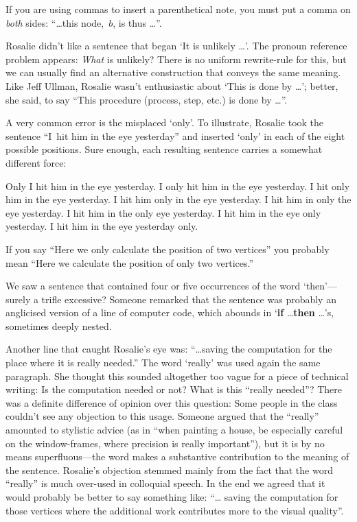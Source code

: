 If you are using commas to insert a parenthetical note, you must put a
comma on {\it both\/} sides: ``\dots this node,~$b$, is thus \dots''.

Rosalie didn't like a sentence that began `It is unlikely \dots'.  The
pronoun reference problem appears: {\it What\/} is unlikely?  There
is no uniform rewrite-rule for this, but we can usually find an
alternative construction that conveys the same meaning. Like Jeff Ullman,
Rosalie wasn't enthusiastic about `This is done by \dots'; better, she
said, to say ``This procedure (process, step, etc.) is done by \dots''.

A very common error is the misplaced `only'. To illustrate, Rosalie
took the sentence ``I~hit him in the eye yesterday'' and inserted
`only' in each of the eight possible positions. Sure enough, each
resulting sentence carries a somewhat different force: 

\smallskip
{\obeylines\parskip 0pt
\qquad\qquad\qquad Only I hit him in the eye yesterday.
\qquad\qquad\qquad I only hit him in the eye yesterday.
\qquad\qquad\qquad I hit only him in the eye yesterday.
\qquad\qquad\qquad I hit him only in the eye yesterday.
\qquad\qquad\qquad I hit him in only the eye yesterday.
\qquad\qquad\qquad I hit him in the only eye yesterday.
\qquad\qquad\qquad I hit him in the eye only yesterday.
\qquad\qquad\qquad I hit him in the eye yesterday only.
}

If
you say ``Here we only calculate the position of two vertices'' you
probably mean ``Here we calculate the position of only two vertices.''

We saw a sentence that contained four or five occurrences of the word
`then'---surely a trifle excessive? Someone remarked that the sentence
was probably an anglicised version of a line of computer code, which
abounds in `{\bf if} \dots {\bf then} \dots's, sometimes deeply nested.

Another line that caught Rosalie's eye was: ``\dots saving the
computation for the place where it is really needed.'' 
The word `really' was used again the same paragraph.
She thought
this sounded altogether too vague for a piece of technical writing: Is
the computation needed or not? What is this ``really needed''? There
was a definite difference of opinion over this question: Some people
in the class couldn't see any objection to this usage. Someone argued
that the ``really'' amounted to stylistic advice (as in ``when
painting a house, be especially careful on the window-frames, where
precision is really important''), but it is  by no means superfluous---the
 word makes a substantive contribution to the meaning of the
sentence. Rosalie's objection stemmed mainly from the fact that the
word ``really'' is much over-used in colloquial speech. In the end we
agreed that it would probably be better to say something like: ``\dots
saving the computation for those vertices where the additional work
contributes more to the visual quality''.


